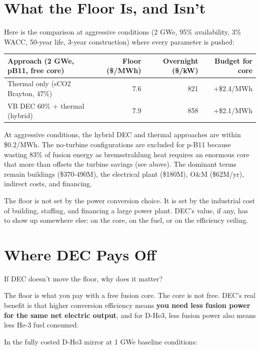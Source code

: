 \documentclass{article}
\begin{document}
\section{What the Floor Is, and Isn't}\label{what-the-floor-is-and-isnt}

Here is the comparison at aggressive conditions (2 GWe, 95\%
availability, 3\% WACC, 50-year life, 3-year construction) where every
parameter is pushed:

\begin{table}[h]
\centering
\begin{tabular}{lrrr}
\toprule
Approach (2 GWe, pB11, free core) & Floor (\$/MWh) & Overnight (\$/kW) & Budget for core \\
\midrule
Thermal only (sCO2 Brayton, 47\%) & 7.6 & 821 & +\$2.4/MWh \\
VB DEC 60\% + thermal (hybrid) & 7.9 & 858 & +\$2.1/MWh \\
\bottomrule
\end{tabular}
\end{table}

At aggressive conditions, the hybrid DEC and thermal approaches are
within \$0.2/MWh. The no-turbine configurations are excluded for p-B11
because wasting 83\% of fusion energy as bremsstrahlung heat requires an
enormous core that more than offsets the turbine savings (see above).
The dominant terms remain buildings (\$370-490M), the electrical plant
(\$180M), O\&M (\$62M/yr), indirect costs, and financing.

The floor is not set by the power conversion choice. It is set by the
industrial cost of building, staffing, and financing a large power
plant. DEC's value, if any, has to show up somewhere else: on the core,
on the fuel, or on the efficiency ceiling.

\section{Where DEC Pays Off}\label{where-dec-pays-off}

If DEC doesn't move the floor, why does it matter?

The floor is what you pay with a free fusion core. The core is not free.
DEC's real benefit is that higher conversion efficiency means
\textbf{you need less fusion power for the same net electric output},
and for D-He3, less fusion power also means less He-3 fuel consumed.

In the fully costed D-He3 mirror at 1 GWe baseline conditions:
\end{document}
